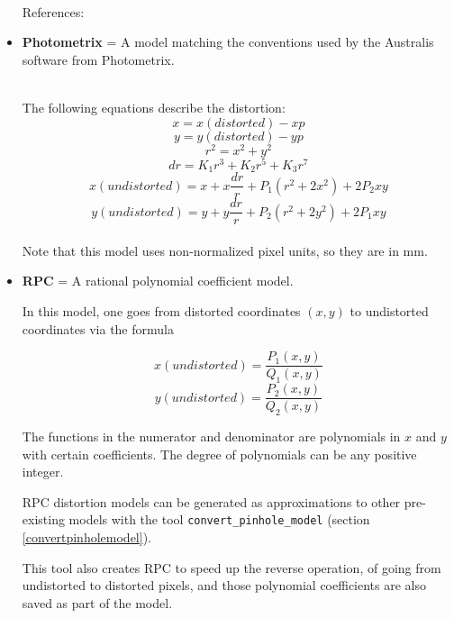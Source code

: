 \begin{itemize}{}
\hfill \\ References:

\item  \textbf{Photometrix} = A model matching the conventions used by the Australis software from Photometrix.

\hfill \\ The following equations describe the distortion:
\[ x = x(distorted) - xp \]
\[ y = y(distorted) - yp \]
\[ r^{2} = x^{2} + y^{2} \]
\[ dr = K_{1}r^{3} + K_{2}r^{5} + K_{3}r^{7} \]
\[ x(undistorted) = x + x\frac{dr}{r} + P_{1}(r^{2} +2x^{2}) + 2P_{2}xy \]
\[ y(undistorted) = y + y\frac{dr}{r} + P_{2}(r^{2} +2y^{2}) + 2P_{1}xy \]
\hfill \\ Note that this model uses non-normalized pixel units, so they
are in mm.

\item  \textbf{RPC} = A rational polynomial coefficient model.

In this model, one goes from distorted coordinates $(x, y)$ to undistorted
coordinates via the formula

\[ x(undistorted) = \frac{P_1(x, y)}{Q_1(x, y)} \]
\[ y(undistorted) = \frac{P_2(x, y)}{Q_2(x, y)} \]

The functions in the numerator and denominator are polynomials in $x$
and $y$ with certain coefficients. The degree of
polynomials can be any positive integer.

RPC distortion models can be generated as approximations to other pre-existing
models with the tool \texttt{convert\_pinhole\_model} (section \ref{convertpinholemodel}).

This tool also creates RPC to speed up the reverse operation, of going
from undistorted to distorted pixels, and those polynomial coefficients
are also saved as part of the model.

\end{itemize}


